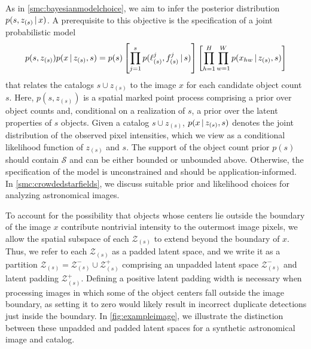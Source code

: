 \documentclass[
  12pt]{article}
\newcommand{\padvert}{\thinspace \vert \thinspace}
\begin{document}
As in \autoref{smc:bayesianmodelchoice}, we aim to infer the posterior distribution $p(s, z_{(s)} \padvert x)$. A prerequisite to this objective is the specification of a joint probabilistic model
\begin{equation*} \label{eq:jointmodel}
    p(s, z_{(s)}) p(x \padvert z_{(s)}, s) = p(s) \left[\prod_{j=1}^s p(\ell_{(s)}^j, f_{(s)}^j \padvert s)\right] \left[\prod_{h=1}^H \prod_{w=1}^W p(x_{hw} \padvert z_{(s)}, s)\right]
\end{equation*}
that relates the catalogs $s \cup z_{(s)}$ to the image $x$ for each candidate object count $s$. Here, $p(s, z_{(s)})$ is a spatial marked point process comprising a prior over object counts and, conditional on a realization of $s$, a prior over the latent properties of $s$ objects. Given a catalog $s \cup z_{(s)}$, $p(x \padvert z_{(s)}, s)$ denotes the joint distribution of the observed pixel intensities, which we view as a conditional likelihood function of $z_{(s)}$ and $s$. The support of the object count prior $p(s)$ should contain $\mathcal{S}$ and can be either bounded or unbounded above. Otherwise, the specification of the model is unconstrained and should be application-informed. In \autoref{smc:crowdedstarfields}, we discuss suitable prior and likelihood choices for analyzing astronomical images.

To account for the possibility that objects whose centers lie outside the boundary of the image $x$ contribute nontrivial intensity to the outermost image pixels, we allow the spatial subspace of each $\mathcal{Z}_{(s)}$ to extend beyond the boundary of $x$. Thus, we refer to each $\mathcal{Z}_{(s)}$ as a padded latent space, and we write it as a partition $\mathcal{Z}_{(s)} = \mathcal{Z}_{(s)}^- \cup \mathcal{Z}_{(s)}^+$ comprising an unpadded latent space $\mathcal{Z}_{(s)}^-$ and latent padding $\mathcal{Z}_{(s)}^+$. Defining a positive latent padding width is necessary when processing images in which some of the object centers fall outside the image boundary, as setting it to zero would likely result in incorrect duplicate detections just inside the boundary. In \autoref{fig:exampleimage}, we illustrate the distinction between these unpadded and padded latent spaces for a synthetic astronomical image and catalog.
\end{document}
